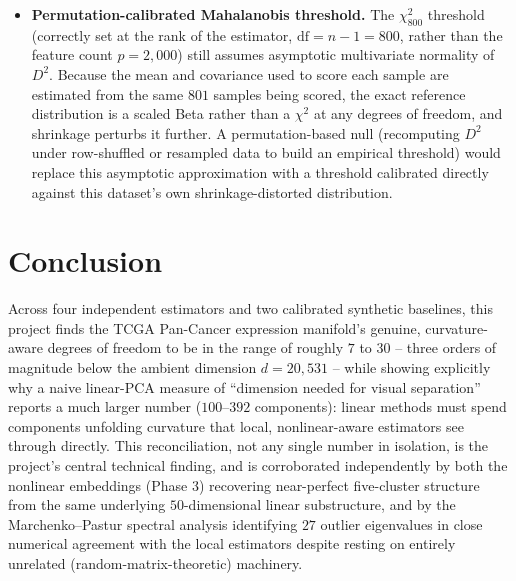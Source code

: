 \documentclass[11pt]{article}
\begin{document}
\begin{itemize}
  (explaining why PCA needs far more components than $D_2$ or the $k$-NN
  MLE suggest), a third synthetic baseline -- e.g., points on a known
  low-dimensional curved manifold (a Swiss roll or S-curve) embedded with
  matched noise in $\mathbb{R}^{20{,}264}$ -- would let every estimator's
  behavior under \emph{curvature} be calibrated directly, rather than
  inferred indirectly as in Section~\ref{sec:synthesis}.
  \item \textbf{Permutation-calibrated Mahalanobis threshold.} The
  $\chi^2_{800}$ threshold (correctly set at the rank of the estimator,
  $\mathrm{df}=n-1=800$, rather than the feature count $p=2{,}000$) still
  assumes asymptotic multivariate normality of $D^2$. Because the mean and
  covariance used to score each sample are estimated from the same $801$
  samples being scored, the exact reference distribution is a scaled Beta
  rather than a $\chi^2$ at any degrees of freedom, and shrinkage perturbs
  it further. A permutation-based null (recomputing $D^2$ under
  row-shuffled or resampled data to build an empirical threshold) would
  replace this asymptotic approximation with a threshold calibrated
  directly against this dataset's own shrinkage-distorted distribution.
\end{itemize}

\section{Conclusion}

Across four independent estimators and two calibrated synthetic baselines,
this project finds the TCGA Pan-Cancer expression manifold's genuine,
curvature-aware degrees of freedom to be in the range of roughly $7$ to
$30$ -- three orders of magnitude below the ambient dimension $d=20{,}531$
-- while showing explicitly why a naive linear-PCA measure of ``dimension
needed for visual separation'' reports a much larger number ($100$--$392$
components): linear methods must spend components unfolding curvature that
local, nonlinear-aware estimators see through directly. This reconciliation,
not any single number in isolation, is the project's central technical
finding, and is corroborated independently by both the nonlinear
embeddings (Phase 3) recovering near-perfect five-cluster structure from
the same underlying $50$-dimensional linear substructure, and by the
Marchenko--Pastur spectral analysis identifying $27$ outlier eigenvalues in
close numerical agreement with the local estimators despite resting on
entirely unrelated (random-matrix-theoretic) machinery.
\end{document}
